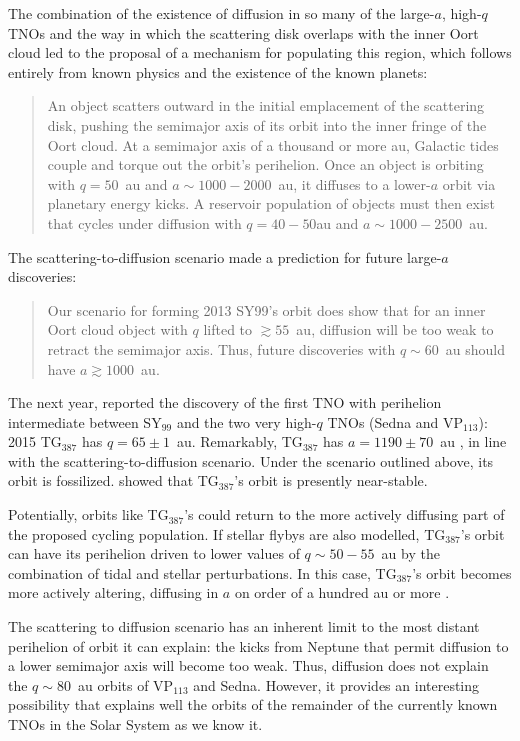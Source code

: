 \documentclass{aastex62}
\begin{document}
The combination of the existence of diffusion in so many of the large-$a$, high-$q$ TNOs and the way in which the scattering disk overlaps with the inner Oort cloud led \citet{bannister17} to the proposal of a mechanism for populating this region, which follows entirely from known physics and the existence of the known planets:
\begin{quote}
An object scatters outward in the initial emplacement of the scattering disk, pushing the semimajor axis of its orbit into the inner fringe of the Oort cloud. At a semimajor axis of a thousand or more au, Galactic tides couple and torque out the orbit's perihelion. Once an object is orbiting with $q = 50$~au and $a\sim1000-2000$~au, it diffuses to a lower-$a$ orbit via planetary energy kicks. A reservoir population of objects must then exist that cycles under diffusion with $q = 40-50$au and $a\sim1000-2500$~au.
\end{quote}
The scattering-to-diffusion scenario made a prediction for future large-$a$ discoveries: 
\begin{quote}
    Our scenario for forming 2013 SY99's orbit does show that for an inner Oort cloud object with $q$ lifted to $\gtrsim 55$~au, diffusion will be too weak to retract the semimajor axis. Thus, future discoveries with $q\sim60$~au should have $a \gtrsim 1000$~au.
\end{quote}
The next year, \citet{sheppard18} reported the discovery of the first TNO with perihelion intermediate between SY$_{99}$ and the two very high-$q$ TNOs (Sedna and VP$_{113}$): 2015 TG$_{387}$ has $q=65 \pm 1$~au. 
Remarkably, TG$_{387}$ has $a = 1190 \pm 70$~au \citep{sheppard18}, in line with the scattering-to-diffusion scenario.
Under the scenario outlined above, its orbit is fossilized. \citet{sheppard18} showed that TG$_{387}$'s orbit is presently near-stable. 

Potentially, orbits like TG$_{387}$'s could return to the more actively diffusing part of the proposed cycling population.
If stellar flybys are also modelled, TG$_{387}$'s orbit can have its perihelion driven to lower values of $q \sim 50-55$~au by the combination of tidal and stellar perturbations. In this case, TG$_{387}$'s orbit becomes more actively altering, diffusing in $a$ on order of a hundred au or more \citep{sheppard18}. 

The scattering to diffusion scenario has an inherent limit to the most distant perihelion of orbit it can explain: the kicks from Neptune that permit diffusion to a lower semimajor axis will become too weak. 
Thus, diffusion does not explain the $q \sim 80$~au orbits of VP$_{113}$ and Sedna. 
However, it provides an interesting possibility that explains well the orbits of the remainder of the currently known TNOs in the Solar System as we know it.
\end{document}

